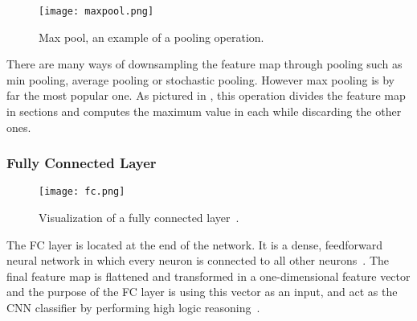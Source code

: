 \documentclass[class=report, crop=false, a4paper, 12pt]{standalone}
\begin{document}
\begin{figure}[!h]
    \centering
    \texttt{[image: maxpool.png]} %
    \caption{Max pool, an example of a pooling operation.}
    \label{fig:maxpool}
\end{figure}

There are many ways of downsampling the feature map through pooling such as min pooling, average pooling or stochastic pooling. However max pooling is by far the most popular one. As pictured in , this operation divides the feature map in sections and computes the maximum value in each while discarding the other ones.

\subsubsection{Fully Connected Layer}

\begin{figure}[H]
    \centering
    \texttt{[image: fc.png]}
    \caption[Visualization of a fully connected layer.]{Visualization of a fully connected layer~\autocite{kostApplyingNeuralNetworks2019}.}
    \label{fig:maxpool}
\end{figure}

The \gls{FC} layer is located at the end of the network. It is a dense, feedforward neural network in which every neuron is connected to all other neurons~\autocite{yamashitaConvolutionalNeuralNetworks2018, alzubaidiReviewDeepLearning2021}. The final feature map is flattened and transformed in a one-dimensional feature vector and the purpose of the FC layer is using this vector as an input, and act as the CNN classifier by performing high logic reasoning~\autocite{guRecentAdvancesConvolutional2018}.
\end{document}
